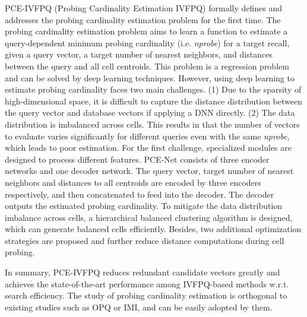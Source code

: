 \documentclass[11pt]{article}
\begin{document}
PCE-IVFPQ (Probing Cardinality Estimation IVFPQ) \cite{DBLP:conf/icde/ZhengYHYLX0J23} formally defines and addresses the probing cardinality estimation problem for the first time. The probing cardinality estimation problem aims to learn a function to estimate a query-dependent minimum probing cardinality (i.e. \textit{nprobe}) for a target recall, given a query vector, a target number of nearest neighbors, and distances between the query and all cell centroids. This problem is a regression problem and can be solved by deep learning techniques. However, using deep learning to estimate probing cardinality faces two main challenges. (1) Due to the sparsity of high-dimensional space, it is difficult to capture the distance distribution between the query vector and database vectors if applying a DNN directly. (2) The data distribution is imbalanced across cells. This results in that the number of vectors to evaluate varies significantly for different queries even with the same \textit{nprobe}, which leads to poor estimation. For the first challenge, specialized modules are designed to process different features. PCE-Net consists of three encoder networks and one decoder network. The query vector, target number of nearest neighbors and distances to all centroids are encoded by three encoders respectively, and then concatenated to feed into the decoder. The decoder outputs the estimated probing cardinality. To mitigate the data distribution imbalance across cells, a hierarchical balanced clustering algorithm is designed, which can generate balanced cells efficiently. Besides, two additional optimization strategies are proposed and further reduce distance computations during cell probing.

In summary, PCE-IVFPQ reduces redundant candidate vectors greatly and achieves the state-of-the-art performance among IVFPQ-based methods w.r.t. search efficiency. The study of probing cardinality estimation is orthogonal to existing studies such as OPQ or IMI, and can be easily adopted by them.
\end{document}
